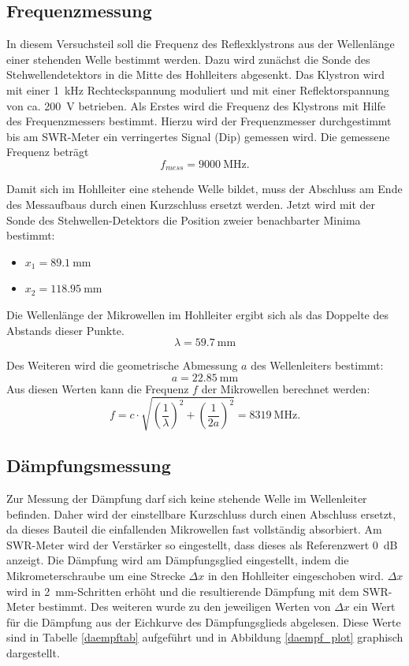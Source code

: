 \documentclass[a4paper]{article}
\begin{document}
\subsection{Frequenzmessung}
In diesem Versuchsteil soll die Frequenz des Reflexklystrons aus der Wellenlänge einer stehenden Welle bestimmt werden. Dazu wird zunächst die Sonde des Stehwellendetektors in die Mitte des Hohlleiters abgesenkt. Das Klystron wird mit einer \SI{1}{\kilo\hertz} Rechteckspannung moduliert und mit einer Reflektorspannung von ca. \SI{200}{\volt} betrieben. Als Erstes wird die Frequenz des Klystrons mit Hilfe des Frequenzmessers bestimmt. Hierzu wird der Frequenzmesser durchgestimmt bis am SWR-Meter ein verringertes Signal (Dip) gemessen wird. Die gemessene Frequenz beträgt
\[
f_{mess} =  \SI{9000}{\mega\hertz}.
\]

\noindent
Damit sich im Hohlleiter eine stehende Welle bildet, muss der Abschluss am Ende des Messaufbaus durch einen Kurzschluss ersetzt werden. Jetzt wird mit der Sonde des Stehwellen-Detektors die Position zweier benachbarter Minima bestimmt:

\begin{itemize}
\item $x_1 = \SI{89.1}{\milli\meter}$
\item $x_2 = \SI{118.95}{\milli\meter}$
 \end{itemize}
Die Wellenlänge der Mikrowellen im Hohlleiter ergibt sich als das Doppelte des Abstands dieser Punkte.
\[
\lambda = \SI{59,7}{\milli\meter}
\]

\noindent
Des Weiteren wird die geometrische Abmessung $a$ des Wellenleiters bestimmt:
\[
a = \SI{22,85}{\milli\meter}
\]
Aus diesen Werten kann die Frequenz $f$ der Mikrowellen berechnet werden:
\[
f = c \cdot \sqrt{\left(\frac1\lambda\right)^2+ \left(\frac1{2a}\right)^2} = \SI{8319}{\mega\hertz}.
\]
\subsection{Dämpfungsmessung}
Zur Messung der Dämpfung darf sich keine stehende Welle im Wellenleiter befinden.
Daher wird der einstellbare Kurzschluss durch einen Abschluss ersetzt, da dieses Bauteil die einfallenden Mikrowellen fast vollständig absorbiert. Am SWR-Meter wird der Verstärker so eingestellt, dass dieses als Referenzwert \SI{0}{\dB} anzeigt.
Die Dämpfung wird am Dämpfungsglied eingestellt, indem die Mikrometerschraube um eine Strecke $\Delta x$ in den Hohlleiter eingeschoben wird.
$\Delta x$ wird in \SI{2}{\milli\meter}-Schritten erhöht und die resultierende Dämpfung mit dem SWR-Meter bestimmt.
Des weiteren wurde zu den jeweiligen Werten von $\Delta x$ ein Wert für die Dämpfung aus der Eichkurve des Dämpfungsglieds abgelesen.
Diese Werte sind in Tabelle \ref{daempftab} aufgeführt und in Abbildung \ref{daempf_plot} graphisch dargestellt.
\end{document}
